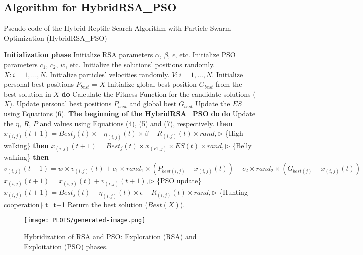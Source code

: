 \documentclass[12pt]{article}
\begin{document}
\subsection*{Algorithm for HybridRSA\_PSO}
\begin{algorithm}[H]
\caption{Pseudo-code of the Hybrid Reptile Search Algorithm with Particle Swarm Optimization (HybridRSA\_PSO)}
\begin{algorithmic}[1]
\State \textbf{Initialization phase}
\State Initialize RSA parameters $\alpha$, $\beta$, $\epsilon$, etc.
\State Initialize PSO parameters $c_1$, $c_2$, $w$, etc.
\State Initialize the solutions' positions randomly. $X: i = 1, ..., N$.
\State Initialize particles' velocities randomly. $V: i = 1, ..., N$.
\State Initialize personal best positions $P_{best}$ = $X$
\State Initialize global best position $G_{best}$ from the best solution in $X$
 \textbf{do}
    \State Calculate the Fitness Function for the candidate solutions ($X$).
    \State Update personal best positions $P_{best}$ and global best $G_{best}$
    \State Update the $ES$ using Equations (6).
    \State \textbf{The beginning of the HybridRSA\_PSO}
     \textbf{do}
         \textbf{do}
            \State Update the $\eta$, $R$, $P$ and values using Equations (4), (5) and (7), respectively.
             \textbf{then}
                \State $x_{(i,j)}(t+1) = Best_j(t) \times - \eta_{(i,j)}(t) \times \beta - R_{(i,j)}(t) \times rand, \triangleright$ \{High walking\}
             \textbf{then}
                \State $x_{(i,j)}(t+1) = Best_j(t) \times x_{(r1,j)} \times ES(t) \times rand, \triangleright$ \{Belly walking\}
             \textbf{then}
                \State $v_{(i,j)}(t+1) = w \times v_{(i,j)}(t) + c_1 \times rand_1 \times (P_{best(i,j)} - x_{(i,j)}(t)) + c_2 \times rand_2 \times (G_{best(j)} - x_{(i,j)}(t))$
                \State $x_{(i,j)}(t+1) = x_{(i,j)}(t) + v_{(i,j)}(t+1), \triangleright$ \{PSO update\}
            \Else
                \State $x_{(i,j)}(t+1) = Best_j(t) - \eta_{(i,j)}(t) \times \epsilon - R_{(i,j)}(t) \times rand, \triangleright$ \{Hunting cooperation\}
            \EndIf
        \EndFor
    \EndFor
    \State t=t+1
\EndWhile
\State Return the best solution ($Best(X)$).
\end{algorithmic}
\end{algorithm}
\begin{figure}[H]
  \centering
  \texttt{[image: PLOTS/generated-image.png]}
  \caption{Hybridization of RSA and PSO: Exploration (RSA) and Exploitation (PSO) phases.}
  \label{fig:hybrid}
\end{figure}
\end{document}
